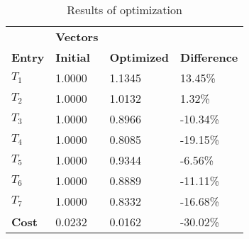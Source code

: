 \begin{table}[H]
\centering
\begin{tabular}{llll}
\textbf{}      & \cellcolor[HTML]{EFEFEF}\textbf{Vectors} & \textbf{} & \textbf{}         \\
\rowcolor[HTML]{EFEFEF} 
\textbf{Entry} & \textbf{Initial} & \textbf{Optimized} & \textbf{Difference} \\
$T_1$ & 1.0000 & 1.1345 & 13.45\% \\ 
$T_2$ & 1.0000 & 1.0132 & 1.32\% \\ 
$T_3$ & 1.0000 & 0.8966 & -10.34\% \\ 
$T_4$ & 1.0000 & 0.8085 & -19.15\% \\ 
$T_5$ & 1.0000 & 0.9344 & -6.56\% \\ 
$T_6$ & 1.0000 & 0.8889 & -11.11\% \\ 
$T_7$ & 1.0000 & 0.8332 & -16.68\% \\ 
\rowcolor[HTML]{EFEFEF} 
\textbf{Cost}  & 0.0232 & 0.0162 & -30.02\% \\ 
\end{tabular}
\caption{Results of optimization}
\label{tab:OptimizationAnalysis}
\end{table}
